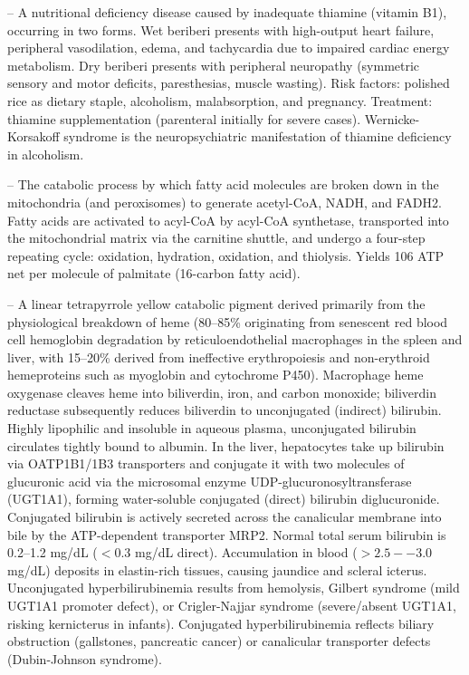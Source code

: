 -- A nutritional deficiency disease caused by inadequate thiamine (vitamin B1), occurring in two forms. Wet beriberi presents with high-output heart failure, peripheral vasodilation, edema, and tachycardia due to impaired cardiac energy metabolism. Dry beriberi presents with peripheral neuropathy (symmetric sensory and motor deficits, paresthesias, muscle wasting). Risk factors: polished rice as dietary staple, alcoholism, malabsorption, and pregnancy. Treatment: thiamine supplementation (parenteral initially for severe cases). Wernicke-Korsakoff syndrome is the neuropsychiatric manifestation of thiamine deficiency in alcoholism.

-- The catabolic process by which fatty acid molecules are broken down in the mitochondria (and peroxisomes) to generate acetyl-CoA, NADH, and FADH2. Fatty acids are activated to acyl-CoA by acyl-CoA synthetase, transported into the mitochondrial matrix via the carnitine shuttle, and undergo a four-step repeating cycle: oxidation, hydration, oxidation, and thiolysis. Yields 106 ATP net per molecule of palmitate (16-carbon fatty acid).

-- A linear tetrapyrrole yellow catabolic pigment derived primarily from the physiological breakdown of heme (80--85\% originating from senescent red blood cell hemoglobin degradation by reticuloendothelial macrophages in the spleen and liver, with 15--20\% derived from ineffective erythropoiesis and non-erythroid hemeproteins such as myoglobin and cytochrome P450). Macrophage heme oxygenase cleaves heme into biliverdin, iron, and carbon monoxide; biliverdin reductase subsequently reduces biliverdin to unconjugated (indirect) bilirubin. Highly lipophilic and insoluble in aqueous plasma, unconjugated bilirubin circulates tightly bound to albumin. In the liver, hepatocytes take up bilirubin via OATP1B1/1B3 transporters and conjugate it with two molecules of glucuronic acid via the microsomal enzyme UDP-glucuronosyltransferase (UGT1A1), forming water-soluble conjugated (direct) bilirubin diglucuronide. Conjugated bilirubin is actively secreted across the canalicular membrane into bile by the ATP-dependent transporter MRP2. Normal total serum bilirubin is 0.2--1.2 mg/dL ($<0.3$ mg/dL direct). Accumulation in blood ($>2.5--3.0$ mg/dL) deposits in elastin-rich tissues, causing jaundice and scleral icterus. Unconjugated hyperbilirubinemia results from hemolysis, Gilbert syndrome (mild UGT1A1 promoter defect), or Crigler-Najjar syndrome (severe/absent UGT1A1, risking kernicterus in infants). Conjugated hyperbilirubinemia reflects biliary obstruction (gallstones, pancreatic cancer) or canalicular transporter defects (Dubin-Johnson syndrome).

